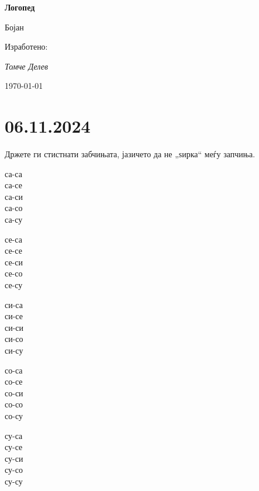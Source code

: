\documentclass[a5paper,12pt]{article}
\newenvironment{instruction}{%
  \begin{tcolorbox}[colback=white,colframe=accentcolor,title={\textbf{Инструкции}},fonttitle=\bfseries] 
}{%
  \end{tcolorbox}
}
\begin{document}
\begin{titlepage}
\centering
{\Huge\textcolor{titlecolor}{\textbf{Логопед}}\par} 
\vspace{1cm}
{\Large\textcolor{accentcolor}{Бојан}\par} 
\vspace{2cm}


\vspace{2cm}
{\large Изработено:\par} 
{\large\textit{Томче Делев}\par}
\vspace{1cm}
{\large\today\par}
\end{titlepage}

\tableofcontents
\newpage

\section{06.11.2024} 

\begin{instruction}
Држете ги стистнати забчињата, јазичето да не „ѕирка“ меѓу запчиња.
\end{instruction}

\noindent %
\begin{minipage}[t]{0.19\textwidth}
  са-са\\
  са-се\\
  са-си\\
  са-со\\
  са-су
\end{minipage}
\hfill 
\begin{minipage}[t]{0.19\textwidth}
  се-са\\
  се-се\\
  се-си\\
  се-со\\
  се-су
\end{minipage}
\hfill %
\begin{minipage}[t]{0.19\textwidth}
  си-са\\
  си-се\\
  си-си\\
  си-со\\
  си-су
\end{minipage}
\hfill %
\begin{minipage}[t]{0.19\textwidth}
  со-са\\
  со-се\\
  со-си\\
  со-со\\
  со-су
\end{minipage}
\hfill %
\begin{minipage}[t]{0.19\textwidth}
  су-са\\
  су-се\\
  су-си\\
  су-со\\
  су-су
\end{minipage}
\end{document}
